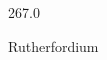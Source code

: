 \documentclass[12pt]{article}
\begin{document}
\hfill{}
\vfill
\begin{center}
  {\fontsize{50}{60}
  }

  \vspace{1em}

  267.0

Rutherfordium
\end{center}
\vfill
\end{document}
